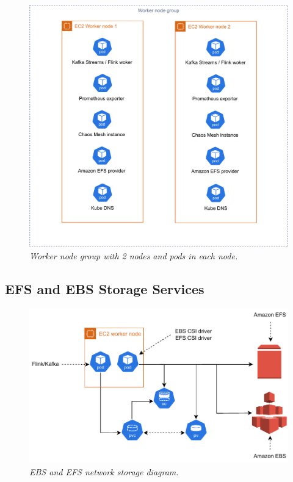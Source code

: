 \begin{figure}[ht]
    \centering
    \includegraphics[width=1\textwidth]{figures/worker-node-group}
    \caption{\textit{Worker node group with 2 nodes and pods in each node.}}
    \label{fig:worker-node-group}
\end{figure}


\subsection{EFS and EBS Storage Services}\label{storage-services}

\begin{figure}[ht]
    \centering
    \includegraphics[width=1\textwidth]{figures/aws-storage-pvc}
    \caption{\textit{EBS and EFS network storage diagram.}}
    \label{fig:aws-storage}
\end{figure}

